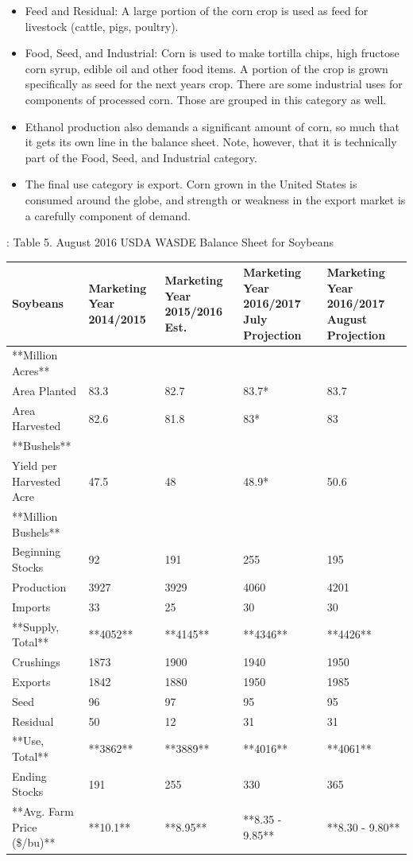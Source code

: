 \documentclass[
]{book}
\providecommand{\tightlist}{%
  \setlength{\itemsep}{0pt}\setlength{\parskip}{0pt}}
\begin{document}
\begin{itemize}
\tightlist
\item
  Feed and Residual: A large portion of the corn crop is used as feed for livestock (cattle, pigs, poultry).
\item
  Food, Seed, and Industrial: Corn is used to make tortilla chips, high fructose corn syrup, edible oil and other food items. A portion of the crop is grown specifically as seed for the next years crop. There are some industrial uses for components of processed corn. Those are grouped in this category as well.
\item
  Ethanol production also demands a significant amount of corn, so much that it gets its own line in the balance sheet. Note, however, that it is technically part of the Food, Seed, and Industrial category.
\item
  The final use category is export. Corn grown in the United States is consumed around the globe, and strength or weakness in the export market is a carefully component of demand.
\end{itemize}

: Table 5. August 2016 USDA WASDE Balance Sheet for Soybeans

\begin{tabular}{l|l|l|l|l}
\hline
Soybeans & Marketing Year 2014/2015 & Marketing Year 2015/2016 Est. & Marketing Year 2016/2017 July Projection & Marketing Year 2016/2017 August Projection\\
\hline
**Million Acres** &  &  &  & \\
\hline
Area Planted & 83.3 & 82.7 & 83.7* & 83.7\\
\hline
Area Harvested & 82.6 & 81.8 & 83* & 83\\
\hline
**Bushels** &  &  &  & \\
\hline
Yield per Harvested Acre & 47.5 & 48 & 48.9* & 50.6\\
\hline
**Million Bushels** &  &  &  & \\
\hline
Beginning Stocks & 92 & 191 & 255 & 195\\
\hline
Production & 3927 & 3929 & 4060 & 4201\\
\hline
Imports & 33 & 25 & 30 & 30\\
\hline
**Supply, Total** & **4052** & **4145** & **4346** & **4426**\\
\hline
Crushings & 1873 & 1900 & 1940 & 1950\\
\hline
Exports & 1842 & 1880 & 1950 & 1985\\
\hline
Seed & 96 & 97 & 95 & 95\\
\hline
Residual & 50 & 12 & 31 & 31\\
\hline
**Use, Total** & **3862** & **3889** & **4016** & **4061**\\
\hline
Ending Stocks & 191 & 255 & 330 & 365\\
\hline
**Avg. Farm Price (\$/bu)** & **10.1** & **8.95** & **8.35 - 9.85** & **8.30 - 9.80**\\
\hline
\end{tabular}
\end{document}
